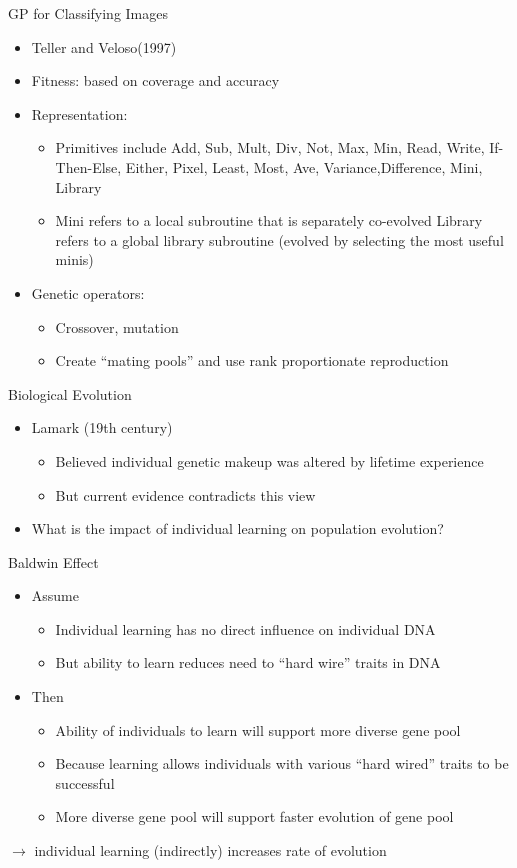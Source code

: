 \documentclass[presentation]{beamer}
\begin{document}
\begin{frame}[label={sec:org56663e3}]{GP for Classifying Images}
\begin{itemize}
\item Teller and Veloso(1997)
\item Fitness:
based on coverage and accuracy
\item Representation:
\begin{itemize}
\item Primitives include Add, Sub, Mult, Div, Not, Max, Min, Read, Write, 
If-Then-Else, Either, Pixel, Least, Most, Ave, Variance,Difference, Mini, Library
\item Mini refers to a local subroutine that is separately co-evolved Library 
refers to a global library subroutine (evolved by selecting the most useful minis)
\end{itemize}
\item Genetic operators:
\begin{itemize}
\item Crossover, mutation
\item Create ``mating pools'' and use rank proportionate reproduction
\end{itemize}
\end{itemize}
\end{frame}
\begin{frame}[label={sec:org046ab5c}]{Biological Evolution}
\begin{itemize}
\item Lamark (19th century)
\begin{itemize}
\item Believed individual genetic makeup was altered by lifetime experience
\item But current evidence contradicts this view
\end{itemize}
\item What is the impact of individual learning on population evolution?
\end{itemize}
\end{frame}
\begin{frame}[label={sec:orgac3959d}]{Baldwin Effect}
\begin{itemize}
\item Assume
\begin{itemize}
\item Individual learning has no direct influence on individual DNA
\item But ability to learn reduces need to ``hard wire'' traits in DNA
\end{itemize}
\item Then
\begin{itemize}
\item Ability of individuals to learn will support more diverse gene pool
\item Because learning allows individuals with various ``hard wired'' traits to be successful
\item More diverse gene pool will support faster evolution of gene pool
\end{itemize}
\end{itemize}

\(\rightarrow\) individual learning (indirectly) increases rate of evolution
\end{frame}
\end{document}
